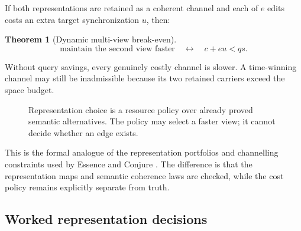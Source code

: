 \documentclass[11pt]{article}
\newtheorem{theorem}{Theorem}
\theoremstyle{remark}
\begin{document}
If both representations are retained as a coherent channel and each of \(e\)
edits costs an extra target synchronization \(u\), then:
\begin{theorem}[Dynamic multi-view break-even]
\[
  \text{maintain the second view faster}
  \quad\longleftrightarrow\quad
  c+eu<qs.
\]
\end{theorem}
Without query savings, every genuinely costly channel is slower.  A
time-winning channel may still be inadmissible because its two retained
carriers exceed the space budget.

\begin{figure}[htbp]
\centering
{}
\caption{Representation choice is a resource policy over already proved
semantic alternatives.  The policy may select a faster view; it cannot decide
whether an edge exists.}
\label{fig:break-even}
\end{figure}

This is the formal analogue of the representation portfolios and channelling
constraints used by Essence and Conjure \cite{essence,conjure}.  The difference
is that the representation maps and semantic coherence laws are checked, while
the cost policy remains explicitly separate from truth.

\subsection{Worked representation decisions}
\label{sec:worked-migration}
\end{document}
